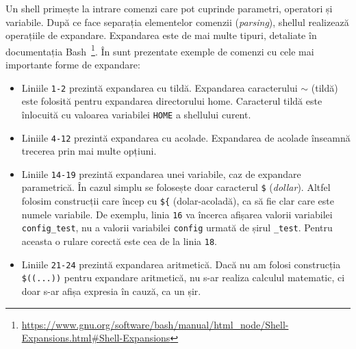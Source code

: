 Un shell primește la intrare comenzi care pot cuprinde parametri, operatori și variabile. După ce face separația elementelor comenzii (\textit{parsing}), shellul realizează operațiile de expandare. Expandarea este de mai
multe tipuri, detaliate în documentația Bash~\footnote{\url{https://www.gnu.org/software/bash/manual/html\_node/Shell-Expansions.html\#Shell-Expansions}}. În  sunt prezentate exemple de comenzi cu cele mai
importante forme de expandare:
\begin{itemize}
  \item Liniile \texttt{1-2} prezintă expandarea cu tildă. Expandarea caracterului \texttt{$\sim$} (tildă) este folosită pentru expandarea directorului home. Caracterul tildă este înlocuită cu valoarea variabilei \texttt{HOME} a shellului curent.
  \item Liniile \texttt{4-12} prezintă expandarea cu acolade.
Expandarea de acolade înseamnă trecerea prin mai multe opțiuni.
  \item Liniile \texttt{14-19} prezintă expandarea unei variabile, caz de expandare parametrică. În cazul simplu se folosește doar caracterul \texttt{\$} (\textit{dollar}). Altfel folosim construcții care încep cu \texttt{\$\{} (dolar-acoladă), ca să fie clar care este numele variabile.
    De exemplu, linia \texttt{16} va încerca afișarea valorii variabilei \texttt{config\_test}, nu a valorii variabilei \texttt{config} urmată de
    șirul \texttt{\_test}. Pentru aceasta o rulare corectă este cea de la linia \texttt{18}.
  \item Liniile \texttt{21-24} prezintă expandarea aritmetică. Dacă nu am folosi construcția \verb|$((...))| pentru expandare aritmetică, nu s-ar realiza calculul matematic, ci doar s-ar afișa expresia în cauză, ca un șir.
\end{itemize}


